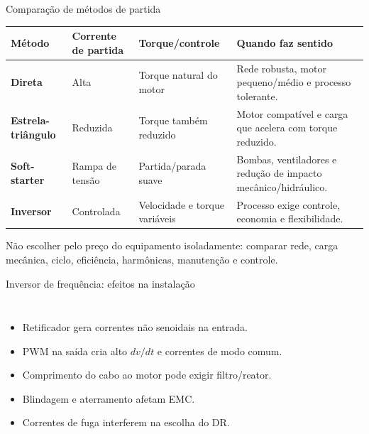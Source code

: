 \begin{frame}{Comparação de métodos de partida}
\scriptsize
\begin{tabularx}{\textwidth}{>{\bfseries}p{2.5cm}p{2.7cm}p{2.8cm}X}
\toprule
Método & Corrente de partida & Torque/controle & Quando faz sentido \\
\midrule
Direta & Alta & Torque natural do motor & Rede robusta, motor pequeno/médio e processo tolerante. \\
Estrela-triângulo & Reduzida & Torque também reduzido & Motor compatível e carga que acelera com torque reduzido. \\
Soft-starter & Rampa de tensão & Partida/parada suave & Bombas, ventiladores e redução de impacto mecânico/hidráulico. \\
Inversor & Controlada & Velocidade e torque variáveis & Processo exige controle, economia e flexibilidade. \\
\bottomrule
\end{tabularx}
\vspace{2mm}
\begin{caixaAt}
Não escolher pelo preço do equipamento isoladamente: comparar rede, carga mecânica, ciclo, eficiência, harmônicas, manutenção e controle.
\end{caixaAt}
\end{frame}

\begin{frame}{Inversor de frequência: efeitos na instalação}
\small
\begin{columns}[T,onlytextwidth]
\begin{itemize}
\item Retificador gera correntes não senoidais na entrada.
\item PWM na saída cria alto $dv/dt$ e correntes de modo comum.
\item Comprimento do cabo ao motor pode exigir filtro/reator.
\item Blindagem e aterramento afetam EMC.
\item Correntes de fuga interferem na escolha do DR.
\end{itemize}
\centering
{}
\end{columns}
\end{frame}

